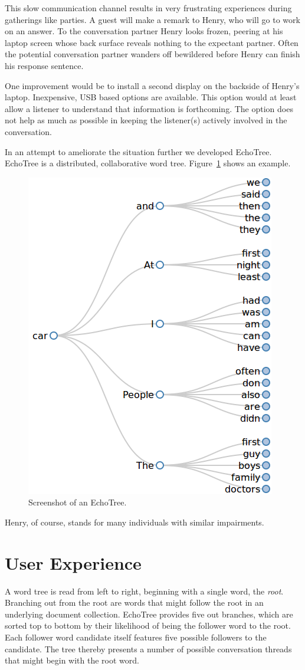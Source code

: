 \documentclass{sigchi}
\begin{document}
This slow communication channel results in very frustrating
experiences during gatherings like parties. A guest will make a remark
to Henry, who will go to work on an answer. To the conversation
partner Henry looks frozen, peering at his laptop screen whose back
surface reveals nothing to the expectant partner. Often the potential
conversation partner wanders off bewildered before Henry can finish
his response sentence.

One improvement would be to install a second display on the backside
of Henry's laptop. Inexpensive, USB based options are available. This
option would at least allow a listener to understand that information
is forthcoming. The option does not help as much as possible in
keeping the listener(s) actively involved in the conversation. 

In an attempt to ameliorate the situation further we developed
EchoTree. EchoTree is a distributed, collaborative word
tree. Figure~\ref{fig:echoTree} shows an example.
\begin{figure}
   \centering
   \includegraphics[width=0.6\columnwidth]{Figs/henryBigramsCarTree.png}
   \caption{Screenshot of an EchoTree.}
   \label{fig:echoTree}
\end{figure}
Henry, of course, stands for many individuals with similar
impairments. 
\section{User Experience}
A word tree is read from left to right, beginning with a single word,
the {\em root}. Branching out from the root are words that might
follow the root in an underlying document collection. EchoTree
provides five out branches, which are sorted top to bottom by their
likelihood of being the follower word to the root. Each follower word
candidate itself features five possible followers to the candidate.
The tree thereby presents a number of possible conversation threads
that might begin with the root word.
\end{document}
